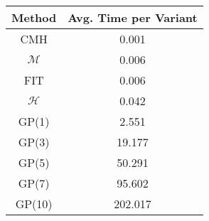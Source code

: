 \centering \begin{tabular}{c|c}
Method	&Avg. Time per Variant\\\hline
CMH	&0.001\\
$\mathcal{M}$	&0.006\\
FIT	&0.006\\
$\mathcal{H}$	&0.042\\
GP(1)	&2.551\\
GP(3)	&19.177\\
GP(5)	&50.291\\
GP(7)	&95.602\\
GP(10)	&202.017\\
\end{tabular}
